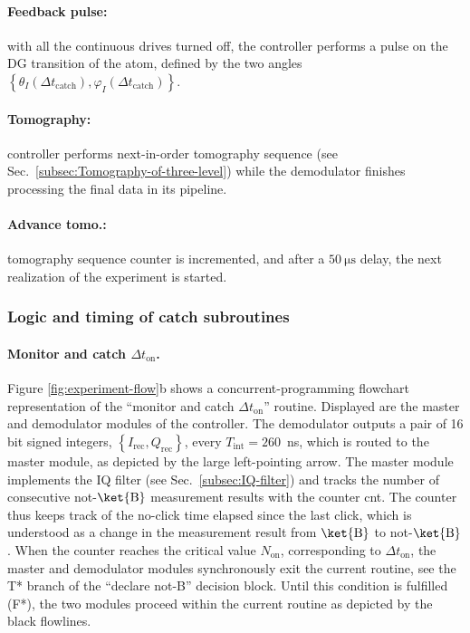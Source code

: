 \paragraph{Feedback pulse: }

with all the continuous drives turned off, the controller performs
a pulse on the DG transition of the atom, defined by the two angles
$\left\{ \theta_{I}\left(\Delta t_{\mathrm{catch}}\right),\varphi_{I}\left(\Delta t_{\mathrm{catch}}\right)\right\} $.

\paragraph{Tomography: }

controller performs next-in-order tomography sequence (see Sec.~\ref{subsec:Tomography-of-three-level})
while the demodulator finishes processing the final data in its pipeline.

\paragraph{Advance tomo.: }

tomography sequence counter is incremented, and after a $50~\mathrm{\mu s}$
delay, the next realization of the experiment is started.

\subsubsection{Logic and timing of catch subroutines}

\paragraph{Monitor and catch $\Delta t_{\mathrm{on}}$.}

Figure \ref{fig:experiment-flow}b shows a concurrent-programming
flowchart representation of the ``monitor and catch $\Delta t_{\mathrm{on}}$''
routine. Displayed are the master and demodulator modules of the controller.
The demodulator outputs a pair of 16 bit signed integers, $\left\{ I_{\mathrm{rec}},Q_{\mathrm{rec}}\right\} $,
every $T_{\mathrm{int}}=260$~ns, which is routed to the master module,
as depicted by the large left-pointing arrow. The master module implements
the IQ filter (see Sec.~\ref{subsec:IQ-filter}) and tracks the number
of consecutive not-$\ket{\mathrm{B}}$ measurement results with the
counter cnt. The counter thus keeps track of the no-click time elapsed
since the last click, which is understood as a change in the measurement
result from $\ket{\mathrm{B}}$ to not-$\ket{\mathrm{B}}$. When the
counter reaches the critical value $N_{\mathrm{on}}$, corresponding
to $\Delta t_{\mathrm{on}}$, the master and demodulator modules synchronously
exit the current routine, see the T{*} branch of the ``declare not-B''
decision block. Until this condition is fulfilled (F{*}), the two
modules proceed within the current routine as depicted by the black
flowlines. 

